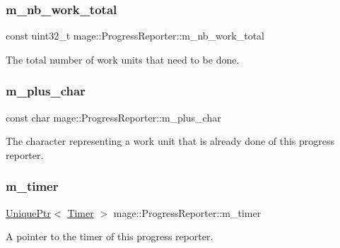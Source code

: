 \subsubsection{\texorpdfstring{m\+\_\+nb\+\_\+work\+\_\+total}{m\_nb\_work\_total}}
{\footnotesize\ttfamily const uint32\+\_\+t mage\+::\+Progress\+Reporter\+::m\+\_\+nb\+\_\+work\+\_\+total\hspace{0.3cm}{\ttfamily [private]}}

The total number of work units that need to be done. \hypertarget{classmage_1_1_progress_reporter_ab3c8d12e79e63ae2b99fde8d6627c230}{}\label{classmage_1_1_progress_reporter_ab3c8d12e79e63ae2b99fde8d6627c230} 
\subsubsection{\texorpdfstring{m\+\_\+plus\+\_\+char}{m\_plus\_char}}
{\footnotesize\ttfamily const char mage\+::\+Progress\+Reporter\+::m\+\_\+plus\+\_\+char\hspace{0.3cm}{\ttfamily [private]}}

The character representing a work unit that is already done of this progress reporter. \hypertarget{classmage_1_1_progress_reporter_a4c5c81ce84ceaab7764bd640a18db788}{}\label{classmage_1_1_progress_reporter_a4c5c81ce84ceaab7764bd640a18db788} 
\subsubsection{\texorpdfstring{m\+\_\+timer}{m\_timer}}
{\footnotesize\ttfamily \hyperlink{namespacemage_a3316d7143a973e37adf1110f2e80ca31}{Unique\+Ptr}$<$ \hyperlink{classmage_1_1_timer}{Timer} $>$ mage\+::\+Progress\+Reporter\+::m\+\_\+timer\hspace{0.3cm}{\ttfamily [private]}}

A pointer to the timer of this progress reporter. 